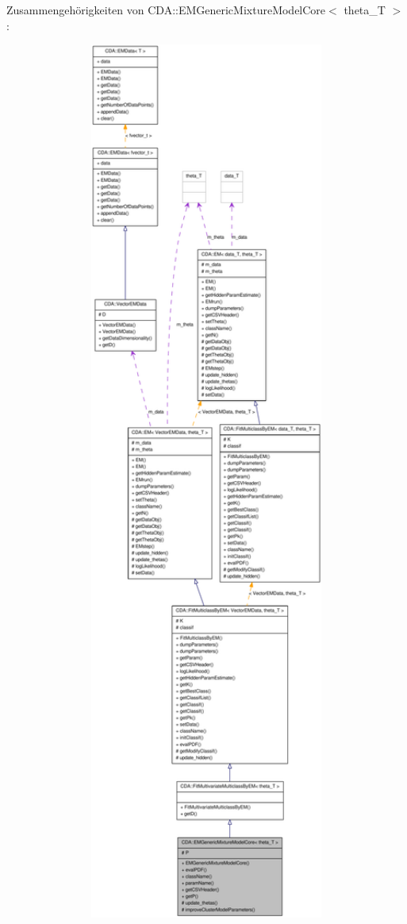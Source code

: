 Zusammengehörigkeiten von CDA::EMGenericMixtureModelCore$<$ theta\_\-T $>$:\nopagebreak
\begin{figure}[H]
\begin{center}
\leavevmode
\includegraphics[width=400pt]{classCDA_1_1EMGenericMixtureModelCore__coll__graph}
\end{center}
\end{figure}

